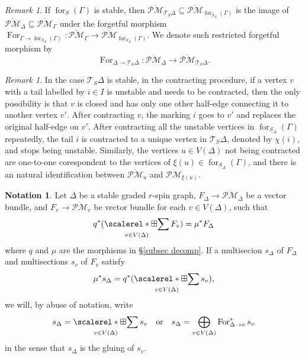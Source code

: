 \documentclass[11pt]{amsart}
\theoremstyle{definition}
\newtheorem{nn}[dummy]{Notation}
\theoremstyle{remark}
\newtheorem{rmk}[dummy]{Remark}
\newcommand{\oPMb}{{\overline{\mathcal{PM}}}}
\newcommand{\<}{\left<}
\renewcommand{\>}{\right>}
\numberwithin{equation}{section}
\DeclareMathOperator*{\bboxplus}{\scalerel*{\boxplus}{\sum}}
\begin{document}
    \begin{rmk}\label{rmk on forget morphism on strata}
   If $\operatorname{for}_{S}(\Gamma)$ is stable, then $\oPMb_{\mathcal T_S \Delta}\subseteq \oPMb_{\operatorname{for}_{S_\Delta}(\Gamma)}$ is the image of $\oPMb_{\Delta}\subseteq \oPMb_{\Gamma}$ under the forgetful morphism
    $\operatorname{For}_{\Gamma \to \operatorname{for}_{S_\Delta}(\Gamma)}\colon \oPMb_{\Gamma}\to \oPMb_{\operatorname{for}_{S_\Delta}(\Gamma)}$. We denote such restricted forgetful morphism by
    $$
    \operatorname{For}_{\Delta \to {\mathcal T_S \Delta}}\colon \oPMb_{\Delta}\to \oPMb_{\mathcal T_S \Delta}.
    $$
        
    \end{rmk}

    \begin{rmk}\label{rmk on contract after forget}
    In the case $\mathcal T_S \Delta$ is stable, in the contracting procedure, if a vertex $v$ with a tail labelled by $i\in I$ is unstable and needs to be contracted, then the only possibility is that $v$ is closed and has only one other half-edge connecting it to another vertex $v'$. After contracting $v$, the marking $i$ goes to $v'$ and replaces the original half-edge on $v'$. After contracting all the unstable vertices in $\operatorname{for}_{S_{\Delta}}(\Gamma)$ repeatedly,  the tail $i$ is contracted to a unique vertex in $\mathcal T_S \Delta$, denoted by $\chi(i)$,  and stops being unstable. Similarly, the vertices $u\in V(\Delta)$ not being contracted are one-to-one corespondent to the vertices of  $\xi(u) \in \operatorname{for}_{S_{\Delta}}(\Gamma)$, and there is an natural identification between $\oPMb_u$ and $\oPMb_{\xi(u)}$.
    \end{rmk}

    \begin{nn}\label{nn bad notation}
        Let $\Delta$ be a stable graded $r$-spin graph, $F_\Delta\to \oPMb_\Delta$ be a vector bundle, and $F_v\to \oPMb_v$ be vector bundle for each $v\in V(\Delta)$, such %
that 
        $$
        q^*(\bboxplus_{v\in V(\Delta)}F_v)=\mu^* F_\Delta
        $$
        where %
$q$ and $\mu$ are the morphisms in \S\ref{subsec decomp}. If a multisecion $s_\Delta$ of $F_\Delta$ and multisections $s_v$ of $F_v$ satisfy
        $$
        \mu^* s_\Delta=q^*(\bboxplus_{v\in V(\Delta)}s_v),
        $$
        we will, by abuse of notation, write
        $$
        s_\Delta=\bboxplus_{v\in V(\Delta)}s_v\quad \text{or} \quad s_\Delta=\bigoplus_{v\in V(\Delta)} \operatorname{For}^*_{\Delta \to v} s_v
        $$
        in the sense that $s_\Delta$ is the gluing of $s_v$.
    \end{nn}
    
\end{document}
